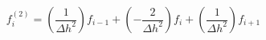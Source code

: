 \begin{equation} 
f^{{(2)}}_{i} = \left(\frac{1}{{\Delta h}^{2}}\right)f_{{i-1}}+ \left(- \frac{2}{{\Delta h}^{2}}\right)f_{{i}}+ \left(\frac{1}{{\Delta h}^{2}}\right)f_{{i+1}}
 \end{equation} 
